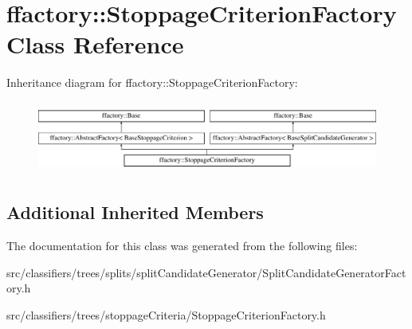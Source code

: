 \hypertarget{classffactory_1_1_stoppage_criterion_factory}{\section{ffactory\-:\-:Stoppage\-Criterion\-Factory Class Reference}
\label{classffactory_1_1_stoppage_criterion_factory}
}
Inheritance diagram for ffactory\-:\-:Stoppage\-Criterion\-Factory\-:\begin{figure}[H]
\begin{center}
\leavevmode
\includegraphics[height=2.393162cm]{classffactory_1_1_stoppage_criterion_factory}
\end{center}
\end{figure}
\subsection*{Additional Inherited Members}


The documentation for this class was generated from the following files\-:\begin{DoxyCompactItemize}
\item 
src/classifiers/trees/splits/split\-Candidate\-Generator/Split\-Candidate\-Generator\-Factory.\-h\item 
src/classifiers/trees/stoppage\-Criteria/Stoppage\-Criterion\-Factory.\-h\end{DoxyCompactItemize}
